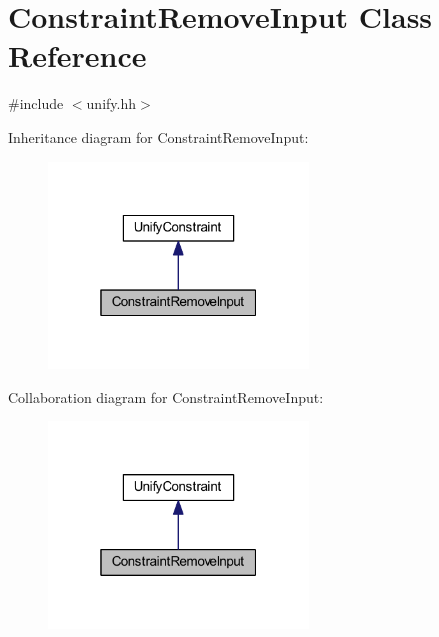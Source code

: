 \hypertarget{class_constraint_remove_input}{}\section{Constraint\+Remove\+Input Class Reference}
\label{class_constraint_remove_input}


{\ttfamily \#include $<$unify.\+hh$>$}



Inheritance diagram for Constraint\+Remove\+Input\+:
\nopagebreak
\begin{figure}[H]
\begin{center}
\leavevmode
\includegraphics[width=196pt]{class_constraint_remove_input__inherit__graph}
\end{center}
\end{figure}


Collaboration diagram for Constraint\+Remove\+Input\+:
\nopagebreak
\begin{figure}[H]
\begin{center}
\leavevmode
\includegraphics[width=196pt]{class_constraint_remove_input__coll__graph}
\end{center}
\end{figure}
